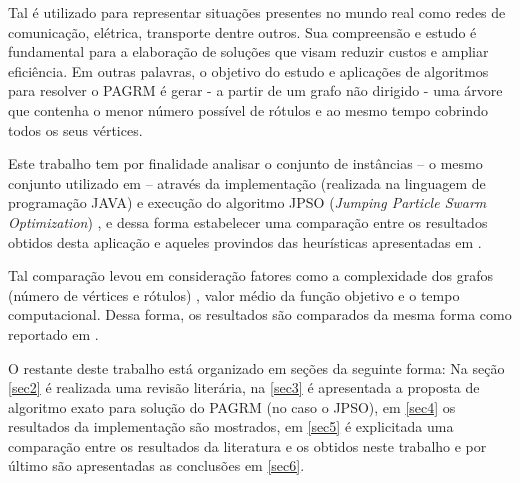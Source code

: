 \documentclass{sig-alternate-05-2015}
\begin{document}
Tal é utilizado para representar situações presentes no mundo real como redes de comunicação, elétrica, transporte dentre outros. Sua compreensão e estudo
é fundamental para a elaboração de soluções que visam reduzir custos e ampliar eficiência. Em outras palavras, o objetivo do estudo e aplicações de algoritmos
para resolver o PAGRM é gerar - a partir de um grafo não dirigido - uma árvore que contenha o menor número possível de rótulos e ao mesmo tempo cobrindo todos
os seus vértices.

Este trabalho tem por finalidade analisar o conjunto de instâncias  -- o mesmo conjunto utilizado em \cite{consoli2009greedy} -- através da implementação (realizada
na linguagem de programação JAVA) e execução do algoritmo JPSO (\textit{Jumping Particle Swarm Optimization}) \cite{consoli2008discrete}, e dessa forma estabelecer
uma comparação entre os resultados obtidos desta aplicação e aqueles provindos das heurísticas apresentadas em \cite{consoli2009greedy}.

Tal comparação levou em consideração fatores como a complexidade dos grafos (número de vértices e rótulos) , valor médio da função objetivo e o tempo computacional.
Dessa forma, os resultados são comparados da mesma forma como reportado em \cite{consoli2009greedy}.

O restante deste trabalho está organizado em seções da seguinte forma: Na seção \ref{sec2} é realizada uma revisão literária, na \ref{sec3} é apresentada
a proposta de algoritmo exato para solução do PAGRM (no caso o JPSO), em \ref{sec4} os resultados da implementação são mostrados, em \ref{sec5} é explicitada
uma comparação entre os resultados da literatura e os obtidos neste trabalho e por último são apresentadas as conclusões em \ref{sec6}.
\end{document}
